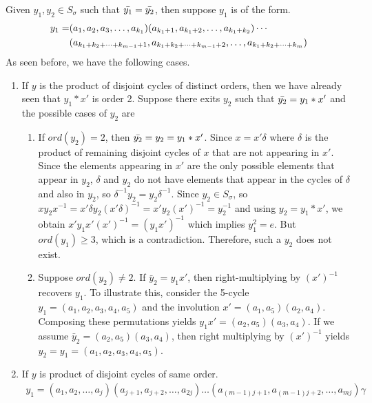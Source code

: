 \documentclass[oneside]{amsart}
\theoremstyle{plain}
\theoremstyle{definition}
\theoremstyle{remark}
\newcommand{\ord}{ord}
\begin{document}
        Given $y_1, y_2 \in S_{\sigma}$ such that $\Bar{y_1} =  \Bar{y_2}$, then suppose $y_1$ is of the form.
        \begin{align*}
            y_1 = &(a_1, a_2, a_3, \ldots, a_{k_1})(a_{k_1 + 1}, a_{k_1 + 2}, \ldots , a_{k_1 + k_2}) \cdots \\
            &(a_{k_1 + k_2+ \cdots + k_{m - 1} + 1}, a_{k_1 + k_2 + \cdots + k_{m - 1} + 2}, \ldots , a_{k_1 + k_2 + \cdots + k_m})\notag
        \end{align*}
        As seen before, we have the following cases.
         \begin{enumerate}
            \item[Case (1).] If $y$ is the product of disjoint cycles of distinct orders, then we have already seen that $y_1*x'$ is order 2. Suppose there exits $y_2$ such that $\Bar{y_2} = y_1*x'$ and the possible cases of $y_2$ are
            \begin{enumerate}
                \item[Case (1.a)] If $\ord(y_2) = 2$, then $\Bar{y_2} = y_2 = y_1*x'$. Since $x = x'\delta$ where $\delta$ is the product of remaining disjoint cycles of $x$ that are not appearing in $x'$. Since the elements appearing in $x'$ are the only possible elements that appear in $y_2$, $\delta$ and $y_2$ do not have elements that appear in the cycles of $\delta$ and also in $y_2$, so $\delta^{-1} y_2 = y_2\delta^{-1}$. Since $y_2 \in S_{\sigma}$, so $xy_2x^{-1} = x'\delta y_2 (x'\delta)^{-1} = x'y_2(x')^{-1} = y_2^{-1}$ and using $y_2 = y_1*x'$, we obtain $x'y_1x'(x')^{-1} = (y_1x')^{-1}$ which implies $y_1^{2} = e$. But $\ord(y_1) \geq 3$, which is a contradiction. Therefore, such a $y_2$ does not exist.
                \item[Case (1.b)] Suppose $\ord(y_2) \neq 2$. If $\bar{y}_2 = y_1 x'$, then right-multiplying by $(x')^{-1}$ recovers $y_1$. To illustrate this, consider the 5-cycle $y_1 = (a_1, a_2, a_3, a_4, a_5)$ and the involution $x' = (a_1, a_5)(a_2, a_4)$. Composing these permutations yields $y_1 x' = (a_2, a_5)(a_3, a_4)$. If we assume $\bar{y}_2 = (a_2, a_5)(a_3, a_4)$, then right multiplying by $(x')^{-1}$ yields $y_2 = y_1 = (a_1, a_2, a_3, a_4, a_5)$.
            \end{enumerate}
            \item[Case (2).] If $y$ is product of disjoint cycles of same order.
            \begin{align*}
                y_1 = (a_1, a_2, \ldots ,a_j)(a_{j + 1}, a_{j + 2}, \ldots, a_{2j})\ldots(a_{(m - 1)j + 1},a_{(m - 1)j + 2}, \ldots, a_{mj})\gamma

\end{align*}
\end{enumerate}
\end{document}

